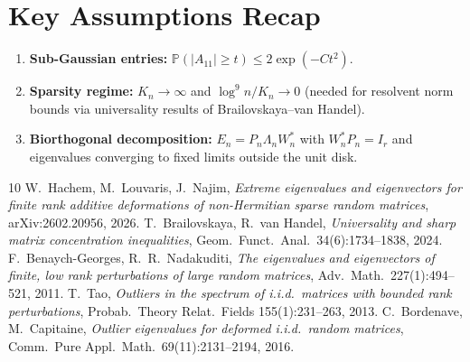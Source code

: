 \documentclass[11pt,a4paper]{article}
\begin{document}
\section*{Key Assumptions Recap}

\begin{enumerate}
\item \textbf{Sub-Gaussian entries:} $\mathbb{P}(|A_{11}| \ge t) \le 2\exp(-Ct^2)$.
\item \textbf{Sparsity regime:} $K_n \to \infty$ and $\log^9 n / K_n \to 0$ (needed for resolvent norm bounds via universality results of Brailovskaya--van Handel).
\item \textbf{Biorthogonal decomposition:} $E_n = P_n \Lambda_n W_n^*$ with $W_n^* P_n = I_r$ and eigenvalues converging to fixed limits outside the unit disk.
\end{enumerate}

\begin{thebibliography}{10}
 W.~Hachem, M.~Louvaris, J.~Najim, \emph{Extreme eigenvalues and eigenvectors for finite rank additive deformations of non-Hermitian sparse random matrices}, arXiv:2602.20956, 2026.
 T.~Brailovskaya, R.~van Handel, \emph{Universality and sharp matrix concentration inequalities}, Geom.\ Funct.\ Anal.\ 34(6):1734--1838, 2024.
 F.~Benaych-Georges, R.~R.~Nadakuditi, \emph{The eigenvalues and eigenvectors of finite, low rank perturbations of large random matrices}, Adv.\ Math.\ 227(1):494--521, 2011.
 T.~Tao, \emph{Outliers in the spectrum of i.i.d.\ matrices with bounded rank perturbations}, Probab.\ Theory Relat.\ Fields 155(1):231--263, 2013.
 C.~Bordenave, M.~Capitaine, \emph{Outlier eigenvalues for deformed i.i.d.\ random matrices}, Comm.\ Pure Appl.\ Math.\ 69(11):2131--2194, 2016.
\end{thebibliography}
\end{document}
